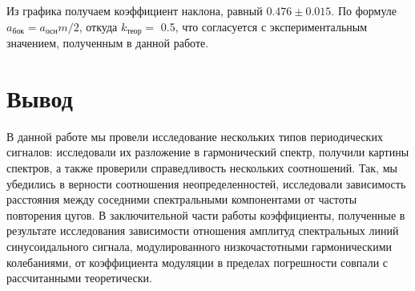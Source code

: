 \documentclass[a4paper,12pt]{article} %
\begin{document}
\hfill \break Из графика получаем коэффициент наклона, равный $0.476\pm 0.015$. По формуле $a_\text{бок}=a_\text{осн}m/2$, откуда $k_\text{теор} = $ 0.5, что согласуется с экспериментальным значением, полученным в данной работе. 

\section{Вывод}

\hfill \break В данной работе мы провели исследование нескольких типов периодических сигналов: исследовали их разложение в гармонический спектр, получили картины спектров, а также проверили справедливость нескольких соотношений. Так, мы убедились в верности соотношения неопределенностей, исследовали зависимость расстояния между соседними спектральными компонентами от частоты повторения цугов. В заключительной части работы коэффициенты, полученные в результате исследования зависимости отношения амплитуд спектральных линий синусоидального сигнала, модулированного низкочастотными гармоническими колебаниями, от коэффициента модуляции в пределах погрешности совпали с рассчитанными теоретически.
\end{document}
